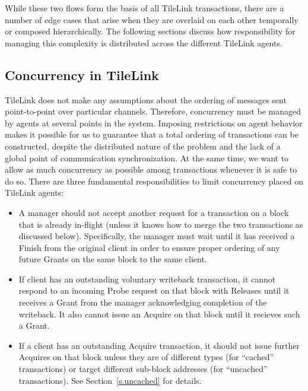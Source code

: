 While these two flows form the basis of all TileLink transactions, there are a number of edge cases that arise when
they are overlaid on each other temporally or composed hierarchically.
The following sections discuss how responsibility for managing this complexity is distributed across the different TileLink agents.

\subsection{Concurrency in TileLink}

TileLink does not make any assumptions about the ordering of messages sent point-to-point over particular channels.
Therefore, concurrency must be managed by agents at several points in the system.
Imposing restrictions on agent behavior makes it possible for us to guarantee that a total ordering of transactions can be constructed,
despite the distributed nature of the problem and the lack of a global point of communication synchronization.
At the same time, we want to allow as much concurrency as possible among transactions whenever it is safe to do so.
There are three fundamental responsibilities to limit concurrency placed on TileLink agents:
\begin{itemize}
\item A manager should not accept another request for a transaction on a block that is already in-flight (unless it knows how to merge the two transactions as discussed below). Specifically, the manager must wait until it has received a Finish from the original client in order to ensure proper ordering of any future Grants on the same block to the same client.
\item If client has an outstanding voluntary writeback transaction, it cannot respond to an incoming Probe request on that block with Releases until it receives a Grant from the manager acknowledging completion of the writeback. It also cannot issue an Acquire on that block until it recieves such a Grant.
\item If a client has an outstanding Acquire transaction, it should not issue further Acquires on that block unless they are of different types (for ``cached'' transactions)
or target different sub-block addresses (for ``uncached'' transactions). See Section~\ref{s.uncached} for details.
\end{itemize}

